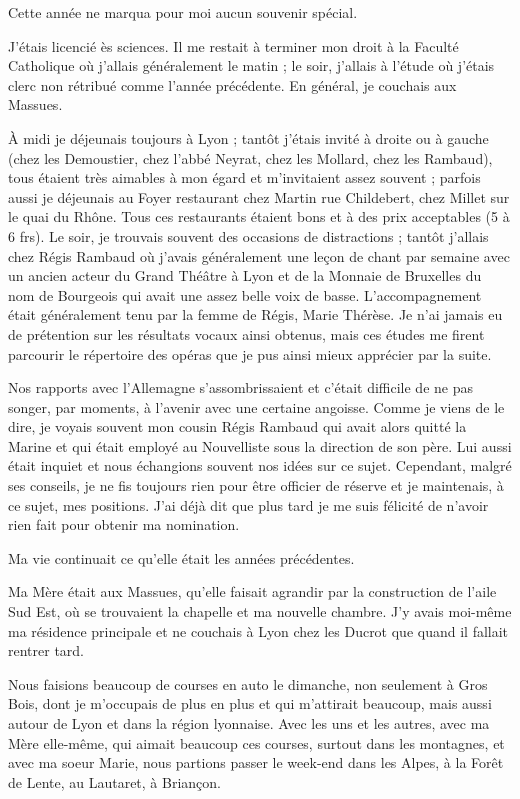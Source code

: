 \documentclass[11pt,a4paper]{report}
\begin{document}
Cette année ne marqua pour moi aucun souvenir spécial.

J'étais licencié ès sciences. Il me restait à terminer mon droit à la Faculté Catholique où j'allais généralement le matin ; le soir, j'allais à l'étude où j'étais clerc non rétribué comme l'année précédente. En général, je couchais aux Massues.

À midi je déjeunais toujours à Lyon ; tantôt j'étais invité à droite ou à gauche (chez les Demoustier, chez l'abbé Neyrat, chez les Mollard, chez les Rambaud), tous étaient très aimables à mon égard et m'invitaient assez souvent ; parfois aussi je déjeunais au Foyer restaurant chez Martin rue Childebert, chez Millet sur le quai du Rhône. Tous ces restaurants étaient bons et à des prix acceptables (5 à 6 frs). Le soir, je trouvais souvent des occasions de distractions ; tantôt j'allais chez Régis Rambaud où j'avais généralement une leçon de chant par semaine avec un ancien acteur du Grand Théâtre à Lyon et de la Monnaie de Bruxelles du nom de Bourgeois qui avait une assez belle voix de basse. L'accompagnement était généralement tenu par la femme de Régis, Marie Thérèse. Je n'ai jamais eu de prétention sur les résultats vocaux ainsi obtenus, mais ces études me firent parcourir le répertoire des opéras que je pus ainsi mieux apprécier par la suite.

Nos rapports avec l'Allemagne s'assombrissaient et c'était difficile de ne pas songer, par moments, à l'avenir avec une certaine angoisse. Comme je viens de le dire, je voyais souvent mon cousin Régis Rambaud qui avait alors quitté la Marine et qui était employé au Nouvelliste sous la direction de son père. Lui aussi était inquiet et nous échangions souvent nos idées sur ce sujet. Cependant, malgré ses conseils, je ne fis toujours rien pour être officier de réserve et je maintenais, à ce sujet, mes positions. J'ai déjà dit que plus tard je me suis félicité de n'avoir rien fait pour obtenir ma nomination.

Ma vie continuait ce qu'elle était les années précédentes.

Ma Mère était aux Massues, qu'elle faisait agrandir par la construction de l'aile Sud Est, où se trouvaient la chapelle et ma nouvelle chambre. J'y avais moi-même ma résidence principale et ne couchais à Lyon chez les Ducrot que quand il fallait rentrer tard.

Nous faisions beaucoup de courses en auto le dimanche, non seulement à Gros Bois, dont je m'occupais de plus en plus et qui m'attirait beaucoup, mais aussi autour de Lyon et dans la région lyonnaise. Avec les uns et les autres, avec ma Mère elle-même, qui aimait beaucoup ces courses, surtout dans les montagnes, et avec ma soeur Marie, nous partions passer le week-end dans les Alpes, à la Forêt de Lente, au Lautaret, à Briançon.
\end{document}

